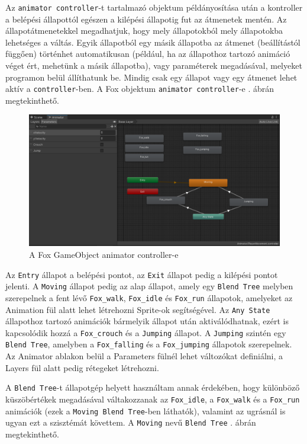 Az \texttt{animator controller}-t tartalmazó objektum példányosítása után a kontroller a belépési állapottól egészen a kilépési állapotig fut az átmenetek mentén. Az állapotátmenetekkel megadhatjuk, hogy mely állapotokból mely állapotokba lehetséges a váltás. Egyik állapotból egy másik állapotba az átmenet (beállítástól függően) történhet automatikusan (például, ha az állapothoz tartozó animáció véget ért, mehetünk a másik állapotba), vagy paraméterek megadásával, melyeket programon belül állíthatunk be. Mindig csak egy állapot vagy egy átmenet lehet aktív a \texttt{controller}-ben. A Fox objektum \texttt{animator controller}-e . ábrán megtekinthető.

\begin{figure}[ht]
\centering
\includegraphics[scale = 0.5]{images/animatorcontroller.png}
\caption{A Fox GameObject animator controller-e}
\label{fig:animatorcontroller}
\end{figure}

Az \texttt{Entry} állapot a belépési pontot, az \texttt{Exit} állapot pedig a kilépési pontot jelenti. A \texttt{Moving} állapot pedig az alap állapot, amely egy \texttt{Blend Tree} melyben szerepelnek a fent lévő \texttt{Fox\_walk}, \texttt{Fox\_idle} és \texttt{Fox\_run} állapotok, amelyeket az Animation fül alatt lehet létrehozni Sprite-ok segítségével. Az \texttt{Any State} állapothoz tartozó animációk bármelyik állapot után aktiválódhatnak, ezért is kapcsolódik hozzá a \texttt{Fox\_crouch} és a \texttt{Jumping} állapot. A \texttt{Jumping} szintén egy \texttt{Blend Tree}, amelyben a \texttt{Fox\_falling} és a \texttt{Fox\_jumping} állapotok szerepelnek. Az Animator ablakon belül a Parameters fülnél lehet változókat definiálni, a Layers fül alatt pedig rétegeket létrehozni.

\newpage
A \texttt{Blend Tree}-t állapotgép helyett használtam annak érdekében, hogy különböző küszöbértékek megadásával váltakozzanak az \texttt{Fox\_idle}, a \texttt{Fox\_walk} és a \texttt{Fox\_run} animációk (ezek a \texttt{Moving Blend Tree}-ben láthatók), valamint az ugrásnál is ugyan ezt a szisztémát követtem. A \texttt{Moving} nevű \texttt{Blend Tree} . ábrán megtekinthető.

